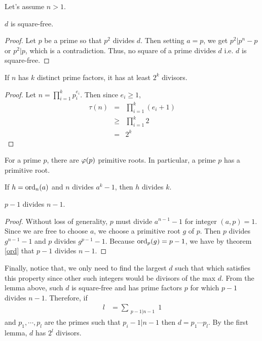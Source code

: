 \documentclass{subfile}
\begin{document}
		\begin{solution}
			Let's assume $n>1$. 
			
			\begin{lemma}
				$d$ is square-free.
			\end{lemma}
			
			\begin{proof}
				Let $p$ be a prime so that $p^2$ divides $d$. Then setting $a=p$, we get $p^2|p^n-p$ or $p^2|p$, which is a contradiction. Thus, no square of a prime divides $d$ i.e. $d$ is square-free.
			\end{proof}
			
			\begin{lemma}
				If $n$ has $k$ distinct prime factors, it has at least $2^k$ divisors.
			\end{lemma}
			
			\begin{proof}
				Let $n=\prod\limits_{i=1}^{k}p_i^{e_i}$. Then since $e_i\geq1$,
				\begin{eqnarray*}
					\tau(n) & = & \prod\limits_{i=1}^{k}(e_i+1)\\
					&\geq& \prod_{i=1}^{k}2\\
					& = & 2^k
				\end{eqnarray*}
			\end{proof}
			
			\begin{theorem}
				For a prime $p$, there are $\varphi (p)$ primitive roots. In particular, a prime $p$ has a primitive root.
			\end{theorem}
			
			\begin{theorem}\label{ord}
				If $h=\mbox{ord}_n(a)$ and $n$ divides $a^k-1$, then $h$ divides $k$.
			\end{theorem}
			
			\begin{lemma}
				$p-1$ divides $n-1$.
			\end{lemma}
			
			\begin{proof}
				Without loss of generality, $p$ must divide $a^{n-1}-1$ for integer $(a,p)=1$. Since we are free to choose $a$, we choose a primitive root $g$ of $p$. Then $p$ divides $g^{n-1}-1$ and $p$ divides $g^{p-1}-1$. Because $\mbox{ord}_p(g)=p-1$, we have by theorem \eqref{ord} that $p-1$ divides $n-1$.
			\end{proof}
			Finally, notice that, we only need to find the largest $d$ such that which satisfies this property since other such integers would be divisors of the max $d$. From the lemma above, such $d$ is square-free and has prime factors $p$ for which $p-1$ divides $n-1$. Therefore, if
				\begin{align*}
					l & = \sum_{\substack{p-1|n-1}}^{}1
				\end{align*}
			and $p_1,\cdots,p_l$ are the primes such that $p_i-1|n-1$ then $d=p_1\cdots p_l$. By the first lemma, $d$ has $2^l$ divisors.
			
		\end{solution}
		
\end{document}
